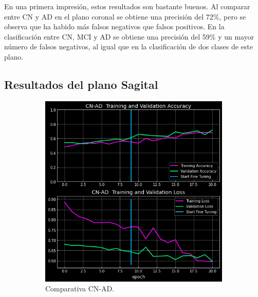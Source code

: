 En una primera impresión, estos resultados son bastante buenos.
Al comparar entre CN y AD en el plano coronal se obtiene una precisión del 72\%, pero se observa que ha habido más
falsos negativos que falsos positivos.
En la clasificación entre CN, MCI y AD se obtiene una precisión del 59\% y un mayor número de falsos negativos, al
igual que en la clasificación de dos clases de este plano.

\subsection{Resultados del plano Sagital}\label{subsec:resultados-del-plano-sagital}

\begin{figure}[H]
    \centering
    \begin{subfigure}{0.45\textwidth}
        \includegraphics[width=\textwidth]{./imgs/resultados/sagittal/CN_AD_output_SAGITTAL}
        \caption{Comparativa CN-AD. }
        \label{fig:sagital-cn-ad}
    \end{subfigure}
    \hspace*{\fill}
    \begin{subfigure}{0.45\textwidth}

\end{subfigure}
\end{figure}
